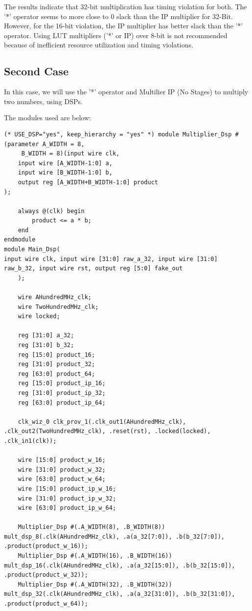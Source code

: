 \documentclass{report}
\begin{document}
The results indicate that 32-bit multiplication has timing violation for both. The '*' operator seems to more close to 0 slack than the IP multiplier for 32-Bit.
However, for the 16-bit violation, the IP multiplier has better slack than the '*' operator. Using LUT multipliers ('*' or IP) over 8-bit is not recommended because of inefficient resource utilization and timing violations.

\subsection{Second Case}
In this case, we will use the '*' operator and Multilier IP (No Stages) to multiply two numbers, using DSPs.

The modules used are below:
\begin{verbatim}
(* USE_DSP="yes", keep_hierarchy = "yes" *) module Multiplier_Dsp #(parameter A_WIDTH = 8,
     B_WIDTH = 8)(input wire clk,
    input wire [A_WIDTH-1:0] a,
    input wire [B_WIDTH-1:0] b,
    output reg [A_WIDTH+B_WIDTH-1:0] product
);

    always @(clk) begin
        product <= a * b;
    end
endmodule
module Main_Dsp(
input wire clk, input wire [31:0] raw_a_32, input wire [31:0] raw_b_32, input wire rst, output reg [5:0] fake_out
    );

    wire AHundredMHz_clk;
    wire TwoHundredMHz_clk;
    wire locked;

    reg [31:0] a_32;
    reg [31:0] b_32;
    reg [15:0] product_16;
    reg [31:0] product_32;
    reg [63:0] product_64;
    reg [15:0] product_ip_16;
    reg [31:0] product_ip_32;
    reg [63:0] product_ip_64;

    clk_wiz_0 clk_prov_1(.clk_out1(AHundredMHz_clk), .clk_out2(TwoHundredMHz_clk), .reset(rst), .locked(locked), .clk_in1(clk));

    wire [15:0] product_w_16;
    wire [31:0] product_w_32;
    wire [63:0] product_w_64;    
    wire [15:0] product_ip_w_16;
    wire [31:0] product_ip_w_32;
    wire [63:0] product_ip_w_64;    

    Multiplier_Dsp #(.A_WIDTH(8), .B_WIDTH(8)) mult_dsp_8(.clk(AHundredMHz_clk), .a(a_32[7:0]), .b(b_32[7:0]), .product(product_w_16));
    Multiplier_Dsp #(.A_WIDTH(16), .B_WIDTH(16)) mult_dsp_16(.clk(AHundredMHz_clk), .a(a_32[15:0]), .b(b_32[15:0]), .product(product_w_32));
    Multiplier_Dsp #(.A_WIDTH(32), .B_WIDTH(32)) mult_dsp_32(.clk(AHundredMHz_clk), .a(a_32[31:0]), .b(b_32[31:0]), .product(product_w_64));


\end{verbatim}
\end{document}
